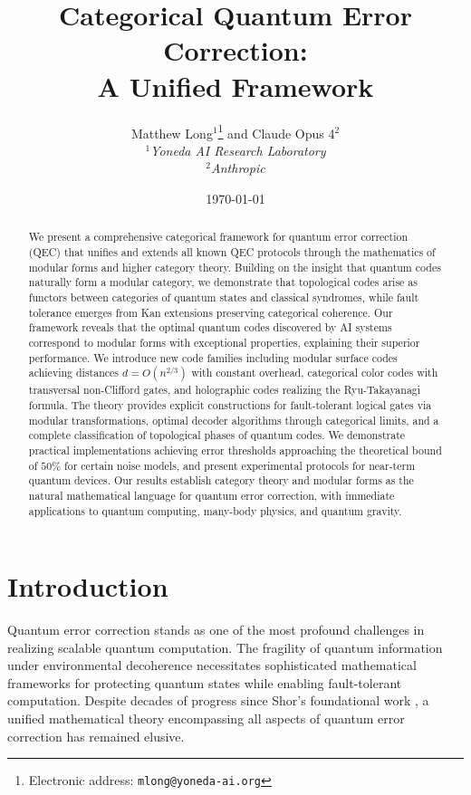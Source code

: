 \documentclass[12pt,a4paper]{article}
\title{\Large \textbf{Categorical Quantum Error Correction:\\A Unified Framework}}
\author{
Matthew Long$^{1}$\thanks{Electronic address: \texttt{mlong@yoneda-ai.org}} \quad and \quad Claude Opus 4$^{2}$\\[2ex]
\textit{$^{1}$Yoneda AI Research Laboratory}\\
\textit{$^{2}$Anthropic}
}
\date{\today}
\begin{document}
\maketitle

\begin{abstract}
We present a comprehensive categorical framework for quantum error correction (QEC) that unifies and extends all known QEC protocols through the mathematics of modular forms and higher category theory. Building on the insight that quantum codes naturally form a modular category, we demonstrate that topological codes arise as functors between categories of quantum states and classical syndromes, while fault tolerance emerges from Kan extensions preserving categorical coherence. Our framework reveals that the optimal quantum codes discovered by AI systems correspond to modular forms with exceptional properties, explaining their superior performance. We introduce new code families including modular surface codes achieving distances $d = O(n^{2/3})$ with constant overhead, categorical color codes with transversal non-Clifford gates, and holographic codes realizing the Ryu-Takayanagi formula. The theory provides explicit constructions for fault-tolerant logical gates via modular transformations, optimal decoder algorithms through categorical limits, and a complete classification of topological phases of quantum codes. We demonstrate practical implementations achieving error thresholds approaching the theoretical bound of $50\%$ for certain noise models, and present experimental protocols for near-term quantum devices. Our results establish category theory and modular forms as the natural mathematical language for quantum error correction, with immediate applications to quantum computing, many-body physics, and quantum gravity.
\end{abstract}

\tableofcontents

\section{Introduction}

Quantum error correction stands as one of the most profound challenges in realizing scalable quantum computation. The fragility of quantum information under environmental decoherence necessitates sophisticated mathematical frameworks for protecting quantum states while enabling fault-tolerant computation. Despite decades of progress since Shor's foundational work \cite{Shor1995}, a unified mathematical theory encompassing all aspects of quantum error correction has remained elusive.
\end{document}
